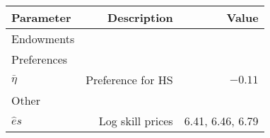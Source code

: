 \begin{tabular}{lrr}
\hline
Parameter & Description  & Value  \\ 
\hline
Endowments &   &   \\ 
Preferences &   &   \\ 
$\bar{\eta}$ & Preference for HS  & $-0.11$  \\ 
Other &   &   \\ 
$\hat{e}{s}$ & Log skill prices  & 6.41, 6.46, 6.79  \\ 
\hline
\end{tabular}%
